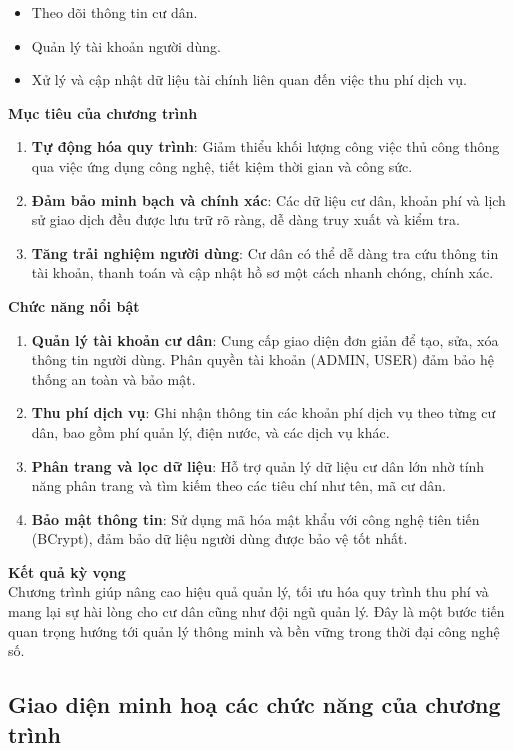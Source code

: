 \documentclass{article}
\begin{document}
\begin{itemize}
    \item Theo dõi thông tin cư dân.
    \item Quản lý tài khoản người dùng.
    \item Xử lý và cập nhật dữ liệu tài chính liên quan đến việc thu phí dịch vụ.
\end{itemize}
 \textbf{Mục tiêu của chương trình}
\begin{enumerate}
    \item \textbf{Tự động hóa quy trình}:
Giảm thiểu khối lượng công việc thủ công thông qua việc ứng dụng công nghệ, tiết kiệm thời gian và công sức.
    \item \textbf{Đảm bảo minh bạch và chính xác}:
Các dữ liệu cư dân, khoản phí và lịch sử giao dịch đều được lưu trữ rõ ràng, dễ dàng truy xuất và kiểm tra.
    \item \textbf{Tăng trải nghiệm người dùng}:
Cư dân có thể dễ dàng tra cứu thông tin tài khoản, thanh toán và cập nhật hồ sơ một cách nhanh chóng, chính xác.
\end{enumerate}
 \textbf{Chức năng nổi bật}
\begin{enumerate}
    \item \textbf{Quản lý tài khoản cư dân}:
Cung cấp giao diện đơn giản để tạo, sửa, xóa thông tin người dùng.
Phân quyền tài khoản (ADMIN, USER) đảm bảo hệ thống an toàn và bảo mật.
    \item \textbf{Thu phí dịch vụ}:
Ghi nhận thông tin các khoản phí dịch vụ theo từng cư dân, bao gồm phí quản lý, điện nước, và các dịch vụ khác.
    \item \textbf{Phân trang và lọc dữ liệu}:
Hỗ trợ quản lý dữ liệu cư dân lớn nhờ tính năng phân trang và tìm kiếm theo các tiêu chí như tên, mã cư dân.
    \item \textbf{Bảo mật thông tin}:
Sử dụng mã hóa mật khẩu với công nghệ tiên tiến (BCrypt), đảm bảo dữ liệu người dùng được bảo vệ tốt nhất.
\end{enumerate}
 \textbf{Kết quả kỳ vọng}\\
Chương trình giúp nâng cao hiệu quả quản lý, tối ưu hóa quy trình thu phí và mang lại sự hài lòng cho cư dân cũng như đội ngũ quản lý. Đây là một bước tiến quan trọng hướng tới quản lý thông minh và bền vững trong thời đại công nghệ số.

\subsection{Giao diện minh hoạ các chức năng của chương trình}
\end{document}
